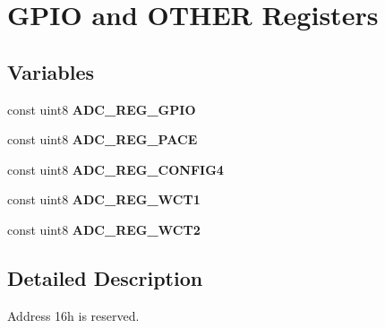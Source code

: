 \hypertarget{group___g_p_i_o___oth}{\section{G\-P\-I\-O and O\-T\-H\-E\-R Registers}
\label{group___g_p_i_o___oth}
}
\subsection*{Variables}
\begin{DoxyCompactItemize}
\item 
\hypertarget{group___g_p_i_o___oth_gaec6b158e528a004ad5a909220c7761ca}{const uint8 {\bfseries A\-D\-C\-\_\-\-R\-E\-G\-\_\-\-G\-P\-I\-O}}\label{group___g_p_i_o___oth_gaec6b158e528a004ad5a909220c7761ca}

\item 
\hypertarget{group___g_p_i_o___oth_ga9b435f7ea9c67ba3fe5c62c92aecdbdb}{const uint8 {\bfseries A\-D\-C\-\_\-\-R\-E\-G\-\_\-\-P\-A\-C\-E}}\label{group___g_p_i_o___oth_ga9b435f7ea9c67ba3fe5c62c92aecdbdb}

\item 
\hypertarget{group___g_p_i_o___oth_gaf1fd0fc728ac488dc8d4dfdf5705b5c6}{const uint8 {\bfseries A\-D\-C\-\_\-\-R\-E\-G\-\_\-\-C\-O\-N\-F\-I\-G4}}\label{group___g_p_i_o___oth_gaf1fd0fc728ac488dc8d4dfdf5705b5c6}

\item 
\hypertarget{group___g_p_i_o___oth_gaae758b99aa9ca11dd132fc67410e830c}{const uint8 {\bfseries A\-D\-C\-\_\-\-R\-E\-G\-\_\-\-W\-C\-T1}}\label{group___g_p_i_o___oth_gaae758b99aa9ca11dd132fc67410e830c}

\item 
\hypertarget{group___g_p_i_o___oth_ga4c5c3d434490e766242f9224bfd2b99a}{const uint8 {\bfseries A\-D\-C\-\_\-\-R\-E\-G\-\_\-\-W\-C\-T2}}\label{group___g_p_i_o___oth_ga4c5c3d434490e766242f9224bfd2b99a}

\end{DoxyCompactItemize}


\subsection{Detailed Description}
Address 16h is reserved. 